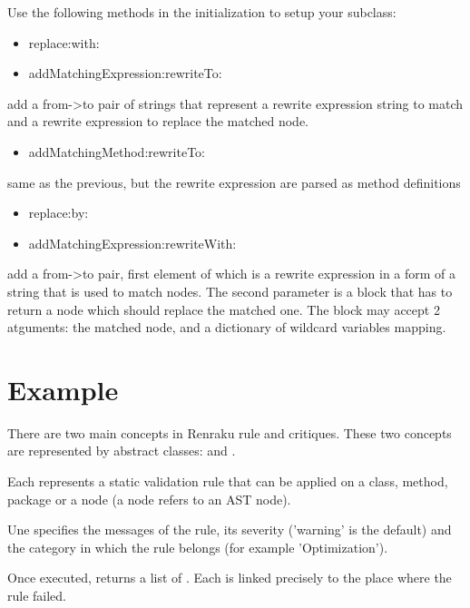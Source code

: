 \documentclass[10pt,twoside,english]{_support/latex/sbabook/sbabook}
\begin{document}
Use the following methods in the initialization to setup your subclass:

\begin{itemize}
    \item replace:with:
    \item addMatchingExpression:rewriteTo:
\end{itemize}

add a from-\textgreater{}to pair of strings that represent a rewrite expression string to match and a rewrite expression to replace the matched node.

\begin{itemize}
    \item addMatchingMethod:rewriteTo:
\end{itemize}

same as the previous, but the rewrite expression are parsed as method definitions

\begin{itemize}
    \item replace:by:
    \item addMatchingExpression:rewriteWith:
\end{itemize}

add 	a from-\textgreater{}to pair, first element of which is a rewrite expression in a form of a string that is used to match nodes. The second parameter is a block that has to return a node which should replace the matched one. The block may accept 2 atguments: the matched node, and a dictionary of wildcard variables mapping.



\section{Example}
There are two main concepts in Renraku rule and critiques. These two concepts
are represented by abstract classes:   and .

Each  represents  a static validation rule that can be applied
on a class, method, package or a node (a node refers to an AST node).

Une  specifies the messages of the rule, its severity ('warning' is the default)
and the category in which the rule belongs (for example 'Optimization').

Once executed,  returns a list of  .
Each  is linked precisely to the place where the rule failed.
\end{document}
